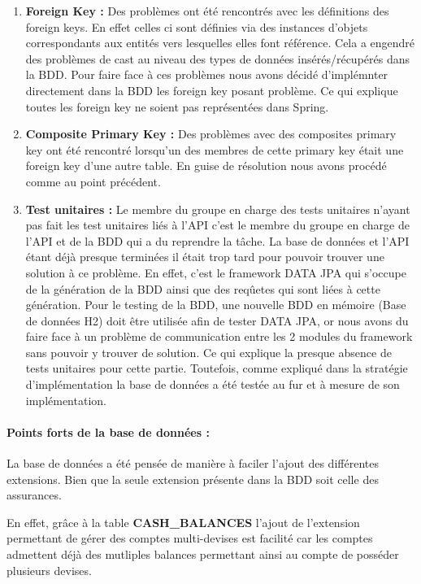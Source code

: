 \documentclass[../rapport.tex]{subfiles}
\begin{document}
	\begin{enumerate}
		\item\textbf{Foreign Key :} Des problèmes ont été rencontrés avec les définitions des
			foreign keys. En effet celles ci sont définies via des instances d'objets 
			correspondants aux entités vers lesquelles elles font référence. Cela a engendré 
			des problèmes de cast au niveau des types de données insérés/récupérés dans la BDD.
			Pour faire face à ces problèmes nous avons décidé d'implémnter directement dans la
			BDD les foreign key posant problème. Ce qui explique toutes les foreign key ne soient
			pas représentées dans Spring.
		\medskip
		\item\textbf{Composite Primary Key :} Des problèmes avec des composites primary key 
			ont été rencontré lorsqu'un des membres de cette primary key était une foreign key 
			d'une autre table. En guise de résolution nous avons procédé comme au point précédent.
		\medskip
		\item\textbf{Test unitaires :} Le membre du groupe en charge des tests unitaires n'ayant
			pas fait les test unitaires liés à l'API c'est le membre du groupe en charge de l'API
			et de la BDD qui a du reprendre la tâche. 
			La base de données et l'API étant déjà presque terminées il était trop tard pour 
			pouvoir trouver une solution à ce problème. 
			En effet, c'est le framework DATA JPA qui s'occupe de la génération de la BDD ainsi 
			que des reqûetes qui sont liées à cette génération. Pour le testing de la BDD, une 
			nouvelle BDD en mémoire (Base de données H2) doit être utilisée afin de tester DATA
			JPA, or nous avons du faire face à un problème de communication entre les 2 modules 
			du framework sans pouvoir y trouver de solution. Ce qui explique la presque absence 
			de tests unitaires pour cette partie. Toutefois, comme expliqué dans la stratégie 
			d'implémentation la base de données a été testée au fur et à mesure de son 
			implémentation.
	\end{enumerate}

	\bigskip

	\paragraph{Points forts de la base de données :}
	La base de données a été pensée de manière à faciler l'ajout des différentes extensions.
	Bien que la seule extension présente dans la BDD soit celle des assurances.
	\medskip

	En effet, grâce à la table \textbf{CASH\_BALANCES} l'ajout de l'extension permettant de gérer
	des comptes multi-devises est facilité car les comptes admettent déjà des mutliples balances
	permettant ainsi au compte de posséder plusieurs devises.
\end{document}
